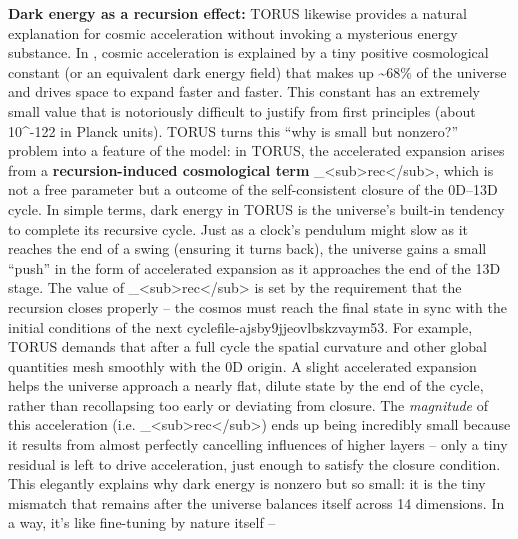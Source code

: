 \documentclass[
]{article}
\begin{document}
\textbf{Dark energy as a recursion effect:} TORUS likewise provides a
natural explanation for cosmic acceleration without invoking a
mysterious energy substance. In \LambdaCDM, cosmic acceleration is explained
by a tiny positive cosmological constant \Lambda (or an equivalent dark energy
field) that makes up \textasciitilde68\% of the universe and drives
space to expand faster and faster. This constant \Lambda has an extremely
small value that is notoriously difficult to justify from first
principles (about 10\^{}-122 in Planck units)\hspace{0pt}. TORUS turns
this ``why is \Lambda small but nonzero?'' problem into a feature of the
model: in TORUS, the accelerated expansion arises from a
\textbf{recursion-induced cosmological term}
\Lambda\_\textless sub\textgreater rec\textless/sub\textgreater, which is not
a free parameter but a outcome of the self-consistent closure of the
0D--13D cycle\hspace{0pt}. In simple terms, dark energy in TORUS is the
universe's built-in tendency to complete its recursive cycle. Just as a
clock's pendulum might slow as it reaches the end of a swing (ensuring
it turns back), the universe gains a small ``push'' in the form of
accelerated expansion as it approaches the end of the 13D stage. The
value of \Lambda\_\textless sub\textgreater rec\textless/sub\textgreater{} is
set by the requirement that the recursion closes properly -- the cosmos
must reach the final state in sync with the initial conditions of the
next cycle\hspace{0pt}file-ajsby9jjeovlbskzvaym53\hspace{0pt}. For
example, TORUS demands that after a full cycle the spatial curvature and
other global quantities mesh smoothly with the 0D origin. A slight
accelerated expansion helps the universe approach a nearly flat, dilute
state by the end of the cycle, rather than recollapsing too early or
deviating from closure\hspace{0pt}. The \emph{magnitude} of this
acceleration (i.e.
\Lambda\_\textless sub\textgreater rec\textless/sub\textgreater) ends up being
incredibly small because it results from almost perfectly cancelling
influences of higher layers -- only a tiny residual is left to drive
acceleration, just enough to satisfy the closure condition\hspace{0pt}.
This elegantly explains why dark energy is nonzero but so small: it is
the tiny mismatch that remains after the universe balances itself across
14 dimensions. In a way, it's like fine-tuning by nature itself --
\end{document}
